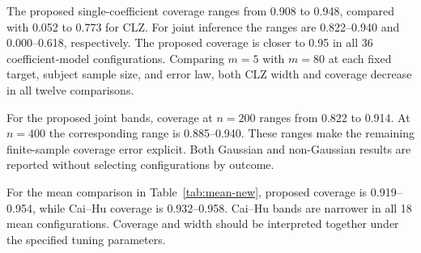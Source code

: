 The proposed single-coefficient coverage ranges from 0.908 to 0.948, compared with 0.052 to 0.773 for CLZ. For joint inference the ranges are 0.822--0.940 and 0.000--0.618, respectively. The proposed coverage is closer to 0.95 in all 36 coefficient-model configurations. Comparing $m=5$ with $m=80$ at each fixed target, subject sample size, and error law, both CLZ width and coverage decrease in all twelve comparisons.

For the proposed joint bands, coverage at $n=200$ ranges from 0.822 to 0.914. At $n=400$ the corresponding range is 0.885--0.940. These ranges make the remaining finite-sample coverage error explicit. Both Gaussian and non-Gaussian results are reported without selecting configurations by outcome.

For the mean comparison in Table~\ref{tab:mean-new}, proposed coverage is 0.919--0.954, while Cai--Hu coverage is 0.932--0.958. Cai--Hu bands are narrower in all 18 mean configurations. Coverage and width should be interpreted together under the specified tuning parameters.
